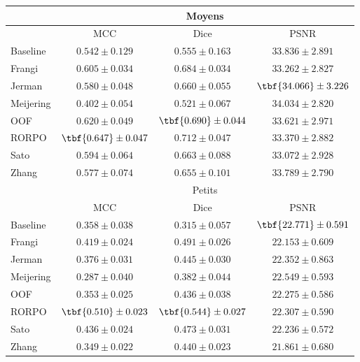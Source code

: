 \begin{table}[!ht]
\begin{center}
\begin{tabular}{lccc}
            \hline
            & \multicolumn{3}{c}{Moyens}                         \\
            \hline    
            & MCC & Dice & PSNR  \\
            Baseline	& $ 0.542 \pm 0.129 $ & $ 0.555 \pm 0.163 $ & $ 33.836 \pm	2.891 $ \\
            Frangi	  & $ 0.605 \pm 0.034 $ & $ 0.684 \pm 0.034 $ & $ 33.262 \pm	2.827 $ \\
            Jerman	  & $ 0.580 \pm 0.048 $ & $ 0.660 \pm 0.055 $ & $ \tbf{34.066} \pm	3.226 $ \\
            Meijering	& $ 0.402 \pm 0.054 $ & $ 0.521 \pm 0.067 $ & $ 34.034 \pm	2.820 $ \\
            OOF	      & $ 0.620 \pm 0.049 $ & $ \tbf{0.690} \pm 0.044 $ & $ 33.621 \pm	2.971 $ \\
            RORPO	    & $ \tbf{0.647} \pm 0.047 $ & $ 0.712 \pm 0.047 $ & $ 33.370 \pm	2.882 $ \\
            Sato	    & $ 0.594 \pm 0.064 $ & $ 0.663 \pm 0.088 $ & $ 33.072 \pm	2.928 $ \\
            Zhang	    & $ 0.577 \pm 0.074 $ & $ 0.655 \pm 0.101 $ & $ 33.789 \pm	2.790 $ \\
            \hline
            & \multicolumn{3}{c}{Petits}                          \\
            \hline
            & MCC & Dice & PSNR  \\
            Baseline	    & $ 0.358 \pm 0.038 $ & $ 0.315 \pm 0.057 $ & $ \tbf{22.771} \pm	0.591 $ \\
            Frangi	      & $ 0.419 \pm 0.024 $ & $ 0.491 \pm 0.026 $ & $ 22.153 \pm	0.609 $ \\
            Jerman  	    & $ 0.376 \pm 0.031 $ & $ 0.445 \pm 0.030 $ & $ 22.352 \pm	0.863 $ \\
            Meijering	    & $ 0.287 \pm 0.040 $ & $ 0.382 \pm 0.044 $ & $ 22.549 \pm	0.593 $ \\
            OOF	          & $ 0.353 \pm 0.025 $ & $ 0.436 \pm 0.038 $ & $ 22.275 \pm	0.586 $ \\
            RORPO	        & $ \tbf{0.510} \pm 0.023 $ & $ \tbf{0.544} \pm 0.027 $ & $ 22.307 \pm	0.590 $ \\
            Sato	        & $ 0.436 \pm 0.024 $ & $ 0.473 \pm 0.031 $ & $ 22.236 \pm	0.572 $ \\
            Zhang	        & $ 0.349 \pm 0.022 $ & $ 0.440 \pm 0.023 $ & $ 21.861 \pm	0.680 $ \\
  \hline
  \end{tabular}
  \end{center}
\end{table}

